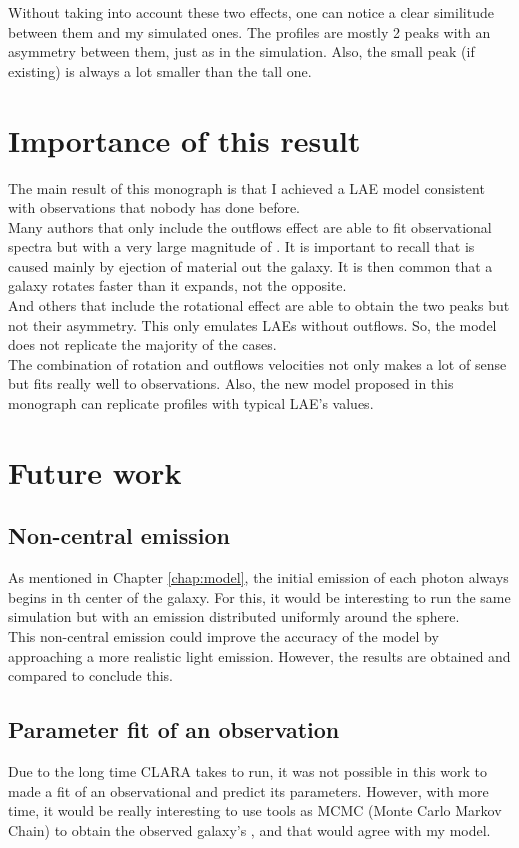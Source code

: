 Without taking into account these two effects, one can notice a clear similitude between them and my simulated ones. The \lya profiles are mostly 2 peaks with an asymmetry between them, just as in the simulation. Also, the small peak (if existing) is always a lot smaller than the tall one.\\

\section{Importance of this result}

The main result of this monograph is that I achieved a LAE model consistent with observations that nobody has done before.\\

Many authors that only include the outflows effect are able to fit observational spectra but with a very large magnitude of \vout. It is important to recall that \vout is caused mainly by ejection of material out the galaxy. It is then common that a galaxy rotates faster than it expands, not the opposite. \\

And others that include the rotational effect are able to obtain the two peaks but not their asymmetry. This only emulates LAEs without outflows. So, the model does not replicate the majority of the cases. \\

The combination of rotation and outflows velocities not only makes a lot of sense but fits really well to observations. Also, the new model proposed in this monograph can replicate \lya profiles with typical LAE's values.\\


\section{Future work}

\subsection{Non-central emission}
As mentioned in Chapter \ref{chap:model}, the initial emission of each photon always begins in th center of the galaxy. For this, it would be interesting to run the same simulation but with an emission distributed uniformly around the sphere. \\

This non-central emission could improve the accuracy of the model by approaching a more realistic light emission. However, the results are obtained and compared to conclude this. \\

\subsection{Parameter fit of an observation}
Due to the long time CLARA takes to run, it was not possible in this work to made a fit of an observational \lya and predict its parameters. However, with more time, it would be really interesting to use tools as MCMC (Monte Carlo Markov Chain) to obtain the observed galaxy's \tauh, \vrot and \vout that would agree with my model. \\